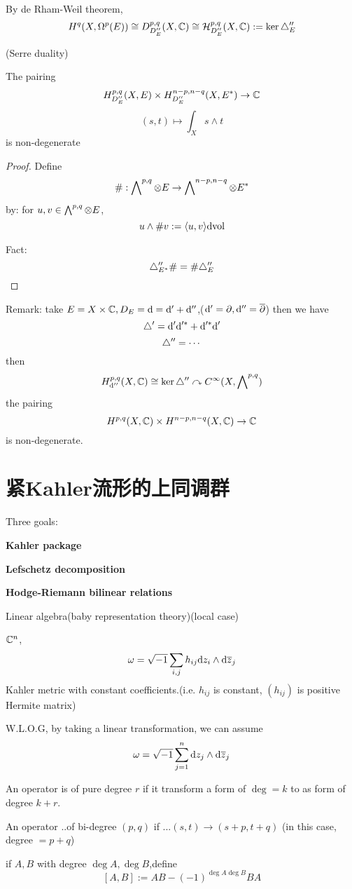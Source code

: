 By de Rham-Weil theorem,
$$H^q(X,\Omega^p(E))\cong D^{p,q}_{D_E''}(X,\mathbb{C})
\cong \mathcal{H}^{p,q}_{D_E''}(X,\mathbb{C}):=\ker\triangle_E''$$

\begin{thm}(Serre duality)

The pairing
$$H^{p,q}_{D_E''}(X,E)
\times H^{n-p,n-q}_{D_E''}(X,E^*)\to\mathbb{C}$$
$$(s,t)\mapsto\int_X s\wedge t$$
is non-degenerate
\end{thm}

\begin{proof}Define
$$\#:\bigwedge\nolimits^{p,q}\otimes E\to \bigwedge\nolimits^{n-p,n-q}\otimes E^*$$
by: for $u,v\in\bigwedge\nolimits^{p,q}\otimes E$,
$$u\wedge\# v:=\langle u,v \rangle\mathrm{d}\text{vol}$$

Fact:
$$\triangle_{E^*}''\#=\#\triangle_E''$$
\end{proof}

Remark: take $E=X\times \mathbb{C},D_E=\mathrm{d}=\mathrm{d}'+\mathrm{d}''$,($\mathrm{d}'=\partial,\mathrm{d}''=\overline{\partial}$)
 then we have
 $$\triangle'=\mathrm{d}'\mathrm{d}'^*+\mathrm{d}'^*\mathrm{d}'$$
 $$\triangle''=\cdots$$
then
$$H^{p,q}_{\mathrm{d}''}(X,\mathbb{C})\cong\ker\triangle''\curvearrowright C^\infty(X,\bigwedge\nolimits^{p,q})$$
the pairing
$$H^{p,q}(X,\mathbb{C})\times H^{n-p,n-q}(X,\mathbb{C})\to\mathbb{C}$$
is non-degenerate.

\section{紧Kahler流形的上同调群}

Three goals:

\textbf{Kahler package}

\textbf{Lefschetz decomposition}

\textbf{Hodge-Riemann bilinear relations}

Linear algebra(baby representation theory)(local case)

$\mathbb{C}^n$,
$$\omega=\sqrt{-1}\sum_{i,j}h_{ij}\mathrm{d} z_i\wedge\mathrm{d}\overline{z}_j$$
Kahler metric with constant coefficients.(i.e.
$h_{ij}$ is constant, $(h_{ij})$ is positive Hermite matrix)

W.L.O.G, by taking a linear transformation, we can assume
$$\omega=\sqrt{-1}\sum_{j=1}^n\mathrm{d} z_j\wedge\mathrm{d}\overline{z}_j$$

\begin{notation}
An operator is of pure degree $r$ if it transform a form of $\deg=k$
to as form of degree $k+r$.

An operator ..of bi-degree $(p,q)$ if ...$(s,t)\to (s+p,t+q)$
(in this case, degree $=p+q$)

if $A,B$ with degree $\deg A,\deg B$,define
$$[A,B]:=AB-(-1)^{\deg A\deg B}BA$$
\end{notation}

